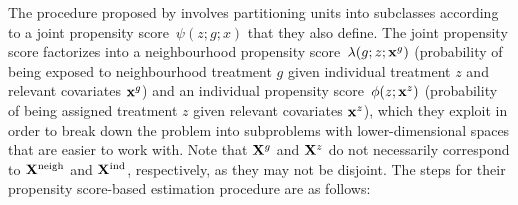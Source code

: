 \documentclass[10pt]{article}
\begin{document}
The procedure proposed by \textcite{Forastiere:2021} involves partitioning units into subclasses according to a joint propensity score~$\psi(z;g;x)$ that they also define. The joint propensity score factorizes into a neighbourhood propensity score~$\lambda(g;z;\mathbf{x}^g)$ (probability of being exposed to neighbourhood treatment $g$ given individual treatment $z$ and relevant covariates $\mathbf{x}^g$) and an individual propensity score~$\phi(z;\mathbf{x}^z)$ (probability of being assigned treatment $z$ given relevant covariates $\mathbf{x}^z$), which they exploit in order to break down the problem into subproblems with lower-dimensional spaces that are easier to work with. Note that $\mathbf{X}^g$ and $\mathbf{X}^z$ do not necessarily correspond to $\mathbf{X}^{\text{neigh}}$ and $\mathbf{X}^{\text{ind}}$, respectively, as they may not be disjoint. The steps for their propensity score-based estimation procedure are as follows:
\end{document}
